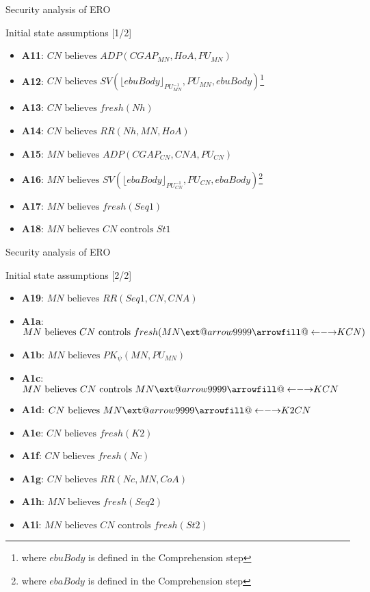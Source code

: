 \documentclass[10pt]{beamer}
\makeatletter
\newcommand\xleftrightarrow[2][]{%
  \ext@arrow 9999{\longleftrightarrowfill@}{#1}{#2}}
\newcommand\longleftrightarrowfill@{%
  \arrowfill@\leftarrow\relbar\rightarrow}
\newcommand{\xtext}[1]{\text{ #1 }}
\makeatother
\begin{document}
\iffalse
\begin{frame}{ERO protocol}
	\centering \texttt{[image: pic/prot2-notation.png]}
\end{frame}
\fi
\begin{frame}{Security analysis of ERO}
	\begin{block}{Initial state assumptions [1/2]}
		\begin{itemize}
			\item \textbf{A11}: $CN \xtext{believes} ADP(CGAP_{MN}, HoA, PU_{MN})$
			\item \textbf{A12}: $CN \xtext{believes} SV(\lfloor ebuBody\rfloor_{PU_{MN}^{-1}}, PU_{MN}, ebuBody)$\footnote{where $ebuBody$ is defined in the Comprehension step}
			\item \textbf{A13}: $CN \xtext{believes} fresh(Nh)$
			\item \textbf{A14}: $CN \xtext{believes} RR(Nh,MN,HoA)$
			\item \textbf{A15}: $MN \xtext{believes} ADP(CGAP_{CN},CNA,PU_{CN})$
			\item \textbf{A16}: $MN \xtext{believes} SV(\lfloor ebaBody\rfloor_{PU_{CN}^{-1}}, PU_{CN}, ebaBody)$\footnote{where $ebaBody$ is defined in the Comprehension step}
			\item \textbf{A17}: $MN \xtext{believes} fresh(Seq1)$
			\item \textbf{A18}: $MN \xtext{believes} CN \xtext{controls} St1$
		\end{itemize}
	\end{block}
\end{frame}
\begin{frame}{Security analysis of ERO}
	\begin{block}{Initial state assumptions [2/2]}
		\begin{itemize}
			\item \textbf{A19}: $MN \xtext{believes} RR(Seq1, CN, CNA)$
			\item \textbf{A1a}: $MN \xtext{believes} CN \xtext{controls} fresh(MN\xleftrightarrow{K}CN)$
			\item \textbf{A1b}: $MN \xtext{believes} PK_\psi(MN,PU_{MN})$
			\item \textbf{A1c}: $MN \xtext{believes} CN \xtext{controls} MN\xleftrightarrow{K}CN$
			\item \textbf{A1d}: $CN \xtext{believes} MN\xleftrightarrow{K2}CN$
			\item \textbf{A1e}: $CN \xtext{believes} fresh(K2)$
			\item \textbf{A1f}: $CN \xtext{believes} fresh(Nc)$
			\item \textbf{A1g}: $CN \xtext{believes} RR(Nc,MN,CoA)$
			\item \textbf{A1h}: $MN \xtext{believes} fresh(Seq2)$
			\item \textbf{A1i}: $MN \xtext{believes} CN \xtext{controls} fresh(St2)$
		\end{itemize}
	\end{block}
\end{frame}
\end{document}
